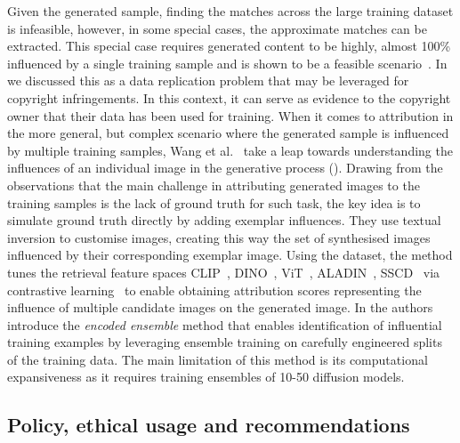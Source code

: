 \documentclass[conference]{IEEEtran}
\begin{document}

Given the generated sample, finding the matches across the large training dataset is infeasible, however, in some special cases, the approximate matches can be extracted.
This special case requires generated content to be highly, almost 100\% influenced by a single training sample and is shown to be a feasible scenario~\cite{carlini_extracting_2023,somepalli_diffusion_2022}. 
In  we discussed this as a data replication problem that may be leveraged for copyright infringements. 
In this context, it can serve as evidence to the copyright owner that their data has been used for training. 
When it comes to attribution in the more general, but complex scenario where the generated sample is influenced by multiple training samples, Wang et al.~\cite{wang_evaluating_2023} take a leap towards understanding the influences of an individual image in the generative process (). 
Drawing from the observations that the main challenge in attributing generated images to the training samples is the lack of ground truth for such task, the key idea is to simulate ground truth directly by adding exemplar influences.
They use textual inversion to customise images, creating this way the set of synthesised images influenced by their corresponding exemplar image. 
Using the dataset, the method tunes the retrieval feature spaces CLIP~\cite{pizzi_self-supervised_2022}, DINO~\cite{caron_emerging_2021}, ViT~\cite{dosovitskiy_image_2021}, ALADIN~\cite{ruta_aladin_2021}, SSCD~\cite{pizzi_self-supervised_2022} via contrastive learning~\cite{oord_representation_2019} to enable obtaining attribution scores representing the influence of multiple candidate images on the generated image.
In \cite{dai_training_2023} the authors introduce the \textit{encoded ensemble} method that enables identification of influential training examples by leveraging ensemble training on carefully engineered splits of the training data. 
The main limitation of this method is its computational expansiveness as it requires training ensembles of 10-50 diffusion models.

\subsection{Policy, ethical usage and recommendations}\label{sec:mitigation-ethical} %
\end{document}
